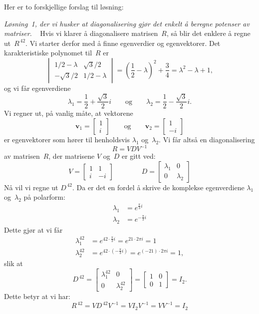 \documentclass[notitlepage,a4paper,12pt,norsk]{IMFeksamen}
\newcommand{\V}[1]{\mathbf{#1}}
\newcommand{\vv}[2]{\begin{bmatrix} #1 \\ #2 \end{bmatrix}}
\renewcommand{\v}{\V{v}}
\newcommand{\0}{\V{0}}
\newcommand{\oppgslutt}{
\begin{center}
\pgfornament[width=6cm]{88}
\end{center}
}
\newenvironment{losning}{\begin{oppgave}}{\oppgslutt\end{oppgave}}
\begin{document}
\begin{losning}
Her er to forskjellige forslag til løsning:

\emph{Løsning~1,
der vi husker at diagonalisering gjør det enkelt
å beregne potenser av matriser.}
\ %
Hvis vi klarer å diagonalisere matrisen~$R$,
så blir det enklere å regne ut~$R^{\,42}$.
Vi starter derfor med å finne egenverdier og egenvektorer.
Det karakteristiske polynomet til~$R$ er
\[
\begin{vmatrix}
        1/2 - \lambda & \sqrt{3}/2           \\
-\sqrt{3}/2           &        1/2 - \lambda
\end{vmatrix}
= \left( \frac{1}{2} - \lambda \right)^2 + \frac{3}{4}
= \lambda^2 - \lambda + 1,
\]
og vi får egenverdiene
\[
\lambda_1 = \frac{1}{2} + \frac{\sqrt{3}}{2} i
\qquad\text{og}\qquad
\lambda_2 = \frac{1}{2} - \frac{\sqrt{3}}{2} i.
\]
Vi regner ut, på vanlig måte, at vektorene
\[
\v_1 = \vv{1}{i}
\qquad\text{og}\qquad
\v_2 = \vv{1}{-i}
\]
er egenvektorer som hører til henholdsvis $\lambda_1$ og~$\lambda_2$.
Vi får altså en diagonalisering
\[
R = VDV^{-1}
\]
av matrisen~$R$, der matrisene $V$ og~$D$ er gitt ved:
\[
V =
\begin{bmatrix}
1 &  1 \\
i & -i
\end{bmatrix}
\qquad\qquad
D =
\begin{bmatrix}
\lambda_1 & 0         \\
0         & \lambda_2
\end{bmatrix}
\]
Nå vil vi regne ut $D^{\,42}$.
Da er det en fordel å skrive de komplekse egenverdiene
$\lambda_1$ og~$\lambda_2$ på polarform:
\begin{align*}
\lambda_1 &= e^{\frac{\pi}{3} i} \\
\lambda_2 &= e^{-\frac{\pi}{3} i}
\end{align*}
Dette gjør at vi får
\begin{align*}
\lambda_1^{42} &= e^{42 \cdot \frac{\pi}{3} i} = e^{21 \cdot 2\pi i} = 1 \\
\lambda_2^{42} &= e^{42 \cdot (-\frac{\pi}{3} i)} = e^{(-21) \cdot 2\pi i} = 1,
\end{align*}
slik at
\[
D^{\,42} =
\begin{bmatrix}
\lambda_1^{42} & 0              \\
0              & \lambda_2^{42}
\end{bmatrix}
=
\begin{bmatrix}
1 & 0 \\
0 & 1
\end{bmatrix}
= I_2.
\]
Dette betyr at vi har:
\[
R^{\,42} = V D^{\,42} V^{-1} = V I_2 V^{-1} = V V^{-1} = I_2
\]


\end{losning}
\end{document}

